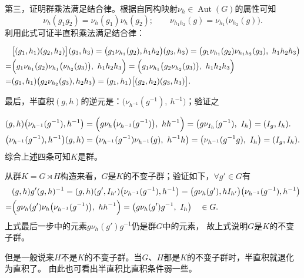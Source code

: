 第三，证明群乘法满足结合律。根据自同构映射$\nu_h\in \operatorname{Aut}(G)$的属性可知
\begin{equation}
    \nu_{h} (g_1 g_2) = \nu_{h}(g_1) \nu_{h}(g_2); \qquad
    \nu_{h_1 h_2} (g) = \nu_{h_1}\bigl(\nu_{h_2}(g)\bigr) .
\end{equation}
利用此式可证半直积乘法满足结合律：

\begin{align*}
    &\bigl[(g_1, h_1)(g_2, h_2)\bigr] (g_3 ,h_3)
    =\bigl(g_1 \nu_{h_1}(g_2), h_1 h_2\bigr) (g_3, h_3)
    =\bigl( g_1 \nu_{h_1}(g_2) \nu_{h_1 h_2}(g_3) ,\  h_1 h_2 h_3 \bigr) \\
    =&\Bigl( g_1 \nu_{h_1}(g_2) \nu_{h_1}\bigl(\nu_{h_2} (g_3)\bigr) ,\  h_1 h_2 h_3 \Bigr)
    =\Bigl( g_1 \nu_{h_1} \bigl(g_2 \nu_{h_2} (g_3)\bigr)   ,\ h_1 h_2 h_3 \Bigr)\\
    =&( g_1, h_1) \bigl( g_2 \nu_{h_2} (g_3), h_2 h_3 \bigr)
    =( g_1, h_1) \bigl[( g_2, h_2) (g_3, h_3)\bigr].
\end{align*}

最后，半直积$(g,h)$的逆元是：$\bigl(\nu_{h^{-1}}(g^{-1}),\ h^{-1}\bigr)$；验证之

\begin{align*}
    &(g,h) \bigl(\nu_{h^{-1}}(g^{-1}), h^{-1}\bigr)
    = \Bigl(g \nu_{h}\bigl(\nu_{h^{-1}}(g^{-1})\bigr) , \ h h^{-1}\Bigr)
    =\bigl(g \nu_{I_h}(g^{-1}), \ I_h \bigr) = (I_g, I_h) . \\
    &\bigl(\nu_{h^{-1}}(g^{-1}), h^{-1}\bigr)  (g,h)
    =\bigl(\nu_{h^{-1}}(g^{-1}) \nu_{h^{-1}}(g), \ h^{-1} h\bigr)
    =\bigl(\nu_{h^{-1}}(g^{-1} g) ,\ I_h\bigr)
    =(I_g , I_h ) .
\end{align*}
综合上述四条可知$K$是群。

从群$K=G \rtimes H$构造来看，$G$是$K$的不变子群；验证如下，$\forall g'\in G$有
\begin{align*}
    &(g,h) g' (g,h)^{-1} =
    (g,h) (g' , I_{h'}) \bigl(\nu_{h^{-1}}(g^{-1}), h^{-1} \bigr) =
    \bigl( g \nu_h (g'), h I_{h'}\bigr) \bigl(\nu_{h^{-1}}(g^{-1}), h^{-1}\bigr)  \\
    =& \Bigl(g \nu_h (g') \nu_h \bigl(\nu_{h^{-1}}(g^{-1})\bigr),\  h h^{-1}\Bigr)
    = \bigl(g \nu_h (g') g^{-1},\ I_h\bigr)  \quad \in G.
\end{align*}
上式最后一步中的元素$g \nu_h (g') g^{-1}$仍是群$G$中的元素，
故上式说明$G$是$K$的不变子群。

但是一般说来$H$不是$K$的不变子群。当$G$、$H$都是$K$的不变子群时，半直积就退化为直积了。
由此也可看出半直积比直积条件弱一些。

